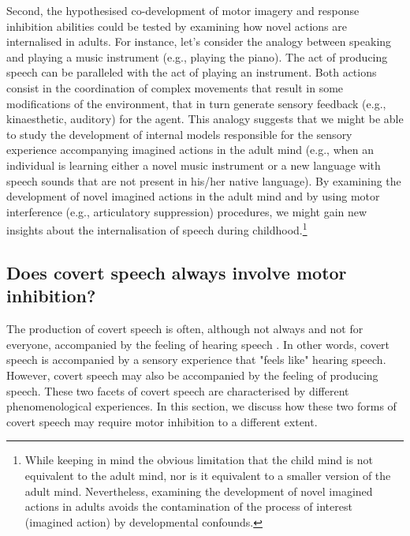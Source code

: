 \documentclass[utf8]{template/frontiersSCNS} %
\begin{document}
Second, the hypothesised co-development of motor imagery and response inhibition abilities could be tested by examining how novel actions are internalised in adults. For instance, let's consider the analogy between speaking and playing a music instrument (e.g., playing the piano). The act of producing speech can be paralleled with the act of playing an instrument. Both actions consist in the coordination of complex movements that result in some modifications of the environment, that in turn generate sensory feedback (e.g., kinaesthetic, auditory) for the agent. This analogy suggests that we might be able to study the development of internal models responsible for the sensory experience accompanying imagined actions in the adult mind (e.g., when an individual is learning either a novel music instrument or a new language with speech sounds that are not present in his/her native language). By examining the development of novel imagined actions in the adult mind and by using motor interference (e.g., articulatory suppression) procedures, we might gain new insights about the internalisation of speech during childhood.\footnote{While keeping in mind the obvious limitation that the child mind is not equivalent to the adult mind, nor is it equivalent to a smaller version of the adult mind. Nevertheless, examining the development of novel imagined actions in adults avoids the contamination of the process of interest (imagined action) by developmental confounds.}


\subsection{Does covert speech always involve motor inhibition?}

The production of covert speech is often, although not always and not for everyone, accompanied by the feeling of hearing speech \citep{hurlburt_investigating_2011}. In other words, covert speech is accompanied by a sensory experience that "feels like" hearing speech. However, covert speech may also be accompanied by the feeling of producing speech. These two facets of covert speech are characterised by different phenomenological experiences. In this section, we discuss how these two forms of covert speech may require motor inhibition to a different extent.
\end{document}
